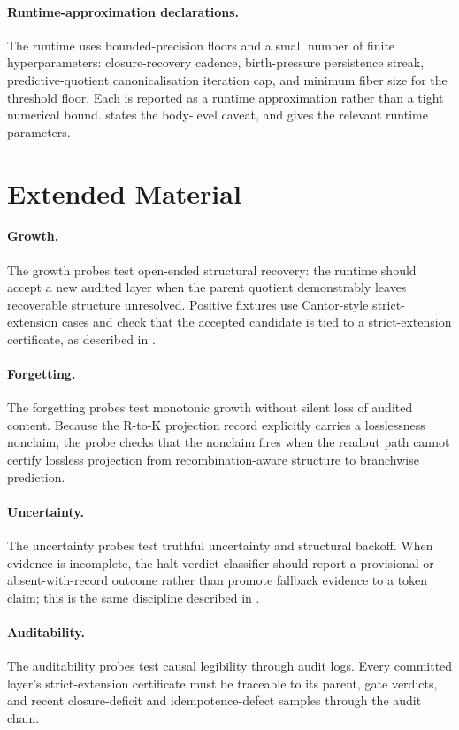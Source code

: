\documentclass{article}
\theoremstyle{definition}
\begin{document}
\paragraph{Runtime-approximation declarations.}
The runtime uses bounded-precision floors and a small number of finite hyperparameters: closure-recovery cadence, birth-pressure persistence streak, predictive-quotient canonicalisation iteration cap, and minimum fiber size for the threshold floor. Each is reported as a runtime approximation rather than a tight numerical bound.  states the body-level caveat, and  gives the relevant runtime parameters.
 \section{Extended Material}\label{app:extended-material}

\paragraph{Growth.}
The growth probes test open-ended structural recovery: the runtime should accept a new audited layer when the parent quotient demonstrably leaves recoverable structure unresolved. Positive fixtures use Cantor-style strict-extension cases and check that the accepted candidate is tied to a strict-extension certificate, as described in .

\paragraph{Forgetting.}
The forgetting probes test monotonic growth without silent loss of audited content. Because the R-to-K projection record explicitly carries a losslessness nonclaim, the probe checks that the nonclaim fires when the readout path cannot certify lossless projection from recombination-aware structure to branchwise prediction.

\paragraph{Uncertainty.}
The uncertainty probes test truthful uncertainty and structural backoff. When evidence is incomplete, the halt-verdict classifier should report a provisional or absent-with-record outcome rather than promote fallback evidence to a token claim; this is the same discipline described in .

\paragraph{Auditability.}
The auditability probes test causal legibility through audit logs. Every committed layer's strict-extension certificate must be traceable to its parent, gate verdicts, and recent closure-deficit and idempotence-defect samples through the audit chain.
\end{document}

